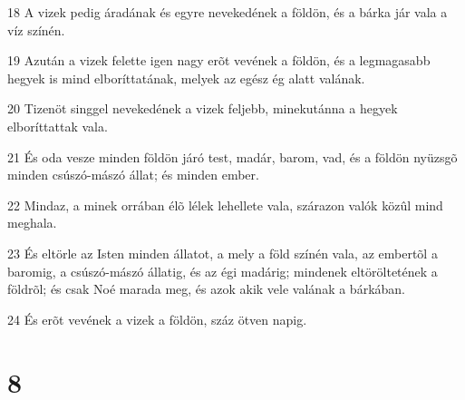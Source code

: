 \par 18 A vizek pedig áradának és egyre nevekedének a földön, és a bárka jár vala a víz színén.
\par 19 Azután a vizek felette igen nagy erõt vevének a földön, és a legmagasabb hegyek is mind elboríttatának, melyek az egész ég alatt valának.
\par 20 Tizenöt singgel nevekedének a vizek feljebb, minekutánna a hegyek elboríttattak vala.
\par 21 És oda vesze minden földön járó test, madár, barom, vad, és a földön nyüzsgõ minden csúszó-mászó állat; és minden ember.
\par 22 Mindaz, a minek orrában élõ lélek lehellete vala, szárazon valók közûl mind meghala.
\par 23 És eltörle az Isten minden állatot, a mely a föld színén vala, az embertõl a baromig, a csúszó-mászó állatig, és az égi madárig; mindenek eltöröltetének a földrõl; és csak Noé marada meg, és azok akik vele valának a bárkában.
\par 24 És erõt vevének a vizek a földön, száz ötven napig.

\chapter{8}

